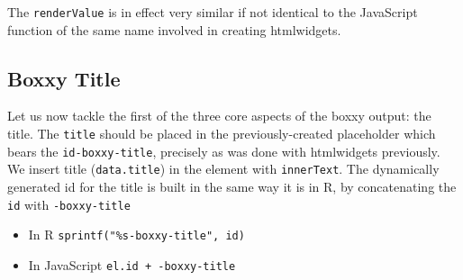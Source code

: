 \documentclass[10pt,]{krantz}
\makeatletter
\newenvironment{Shaded}{\begin{snugshade}}{\end{snugshade}}
\newcommand{\AttributeTok}[1]{\textcolor[rgb]{0.61,0.61,0.61}{#1}}
\newcommand{\CommentTok}[1]{\textcolor[rgb]{0.37,0.37,0.37}{\textit{#1}}}
\newcommand{\ControlFlowTok}[1]{\textcolor[rgb]{0.27,0.27,0.27}{\textbf{#1}}}
\newcommand{\DataTypeTok}[1]{\textcolor[rgb]{0.27,0.27,0.27}{#1}}
\newcommand{\KeywordTok}[1]{\textcolor[rgb]{0.27,0.27,0.27}{\textbf{#1}}}
\newcommand{\NormalTok}[1]{#1}
\newcommand{\OperatorTok}[1]{\textcolor[rgb]{0.43,0.43,0.43}{\textbf{#1}}}
\newcommand{\StringTok}[1]{\textcolor[rgb]{0.5,0.5,0.5}{#1}}
\newcommand{\VariableTok}[1]{\textcolor[rgb]{0,0,0}{#1}}
\providecommand{\tightlist}{%
  \setlength{\itemsep}{0pt}\setlength{\parskip}{0pt}}
\newenvironment{kframe}{%
\medskip{}
\setlength{\fboxsep}{.8em}
 \def\at@end@of@kframe{}%
 \ifinner\ifhmode%
  \def\at@end@of@kframe{\end{minipage}}%
  \begin{minipage}{\columnwidth}%
 \fi\fi%
 \def\FrameCommand##1{\hskip\@totalleftmargin \hskip-\fboxsep
 \colorbox{shadecolor}{##1}\hskip-\fboxsep
     \hskip-\linewidth \hskip-\@totalleftmargin \hskip\columnwidth}%
 \MakeFramed {\advance\hsize-\width
   \@totalleftmargin\z@ \linewidth\hsize
   \@setminipage}}%
 {\par\unskip\endMakeFramed%
 \at@end@of@kframe}
\renewenvironment{Shaded}{\begin{kframe}}{\end{kframe}}
\newenvironment{rmdblock}[1]
  {
  \begin{itemize}
  \renewcommand{\labelitemi}{
    \raisebox{-.7\height}[0pt][0pt]{
      {\setkeys{Gin}{width=3em,keepaspectratio}\texttt{[image: images/\#1]}}
    }
  }
  \setlength{\fboxsep}{1em}
  \begin{kframe}
  \item
  }
  {
  \end{kframe}
  \end{itemize}
  }
\newenvironment{rmdnote}
  {\begin{rmdblock}{note}}
  {\end{rmdblock}}
\makeatother
\begin{document}
\begin{rmdnote}
The \texttt{renderValue} is in effect very similar if not identical to
the JavaScript function of the same name involved in creating
htmlwidgets.
\end{rmdnote}

\hypertarget{shiny-output-boxxy-title}{%
\subsection{Boxxy Title}\label{shiny-output-boxxy-title}}

Let us now tackle the first of the three core aspects of the boxxy output: the title. The \texttt{title} should be placed in the previously-created placeholder which bears the \texttt{id-boxxy-title}, precisely as was done with htmlwidgets previously. We insert title (\texttt{data.title}) in the element with \texttt{innerText}. The dynamically generated id for the title is built in the same way it is in R, by concatenating the \texttt{id} with \texttt{-boxxy-title}

\begin{itemize}
\tightlist
\item
  In R \texttt{sprintf("\%s-boxxy-title",\ id)}
\item
  In JavaScript \texttt{el.id\ +\ \textquotesingle{}-boxxy-title\textquotesingle{}}
\end{itemize}

\begin{Shaded}
\end{Shaded}
\end{document}
